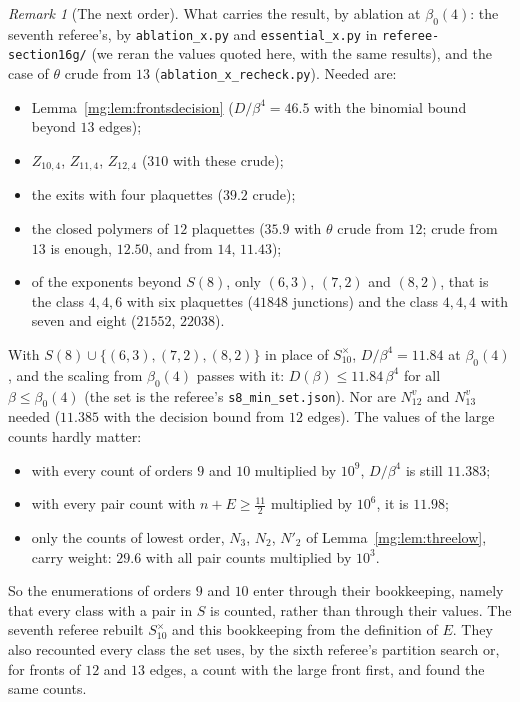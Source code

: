 \documentclass[11pt,a4paper]{article}
\theoremstyle{definition}
\theoremstyle{remark}
\newtheorem{remark}[theorem]{Remark}
\begin{document}
\begin{remark}[The next order]
What carries the result, by ablation at $\beta_0(4)$: the seventh referee's, by \texttt{ablation\_x.py} and \texttt{essential\_x.py} in \texttt{referee-section16g/} (we reran the
values quoted here, with the same results), and the case of $\theta$ crude from $13$ (\texttt{ablation\_x\_recheck.py}). Needed are:
\begin{itemize}
\item Lemma~\ref{mg:lem:frontsdecision} ($D/\beta^4=46.5$ with the binomial bound beyond $13$ edges);
\item $Z_{10,4}$, $Z_{11,4}$, $Z_{12,4}$ ($310$ with these crude);
\item the exits with four plaquettes ($39.2$ crude);
\item the closed polymers of $12$ plaquettes ($35.9$ with $\theta$ crude from $12$; crude from $13$ is enough, $12.50$, and from $14$, $11.43$);
\item of the exponents beyond $S(8)$, only $(6,3)$, $(7,2)$ and $(8,2)$, that is the class $4,4,6$ with six plaquettes ($41848$ junctions) and the class $4,4,4$ with seven and eight
($21552$, $22038$).
\end{itemize}
With $S(8)\cup\{(6,3),(7,2),(8,2)\}$ in place of $S^\times_{10}$, $D/\beta^4=11.84$ at $\beta_0(4)$, and the scaling from $\beta_0(4)$ passes with it: $D(\beta)\le11.84\,\beta^4$ for all
$\beta\le\beta_0(4)$ (the set is the referee's \texttt{s8\_min\_set.json}). Nor are $N^v_{12}$ and $N^v_{13}$ needed ($11.385$ with the decision bound from $12$ edges). The values of
the large counts hardly matter:
\begin{itemize}
\item with every count of orders $9$ and $10$ multiplied by $10^9$, $D/\beta^4$ is still $11.383$;
\item with every pair count with $n+E\ge\frac{11}2$ multiplied by $10^6$, it is $11.98$;
\item only the counts of lowest order, $N_3$, $N_2$, $N'_2$ of Lemma~\ref{mg:lem:threelow}, carry weight: $29.6$ with all pair counts multiplied by $10^3$.
\end{itemize}
So the enumerations of orders $9$ and $10$ enter through their bookkeeping, namely that every class with a pair in $S$ is counted, rather than through their values. The seventh referee
rebuilt $S^\times_{10}$ and this bookkeeping from the definition of $E$. They also recounted every class the set uses, by the sixth referee's partition search or, for fronts of $12$ and $13$
edges, a count with the large front first, and found the same counts.
\end{remark}
\end{document}
